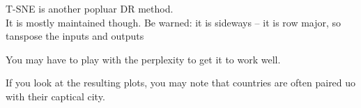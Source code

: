 \documentclass[11pt]{article}
\begin{document}
T-SNE is another popluar DR method.\\It is mostly maintained though. Be
warned: it is sideways -- it is row major, so tanspose the inputs and
outputs

You may have to play with the perplexity to get it to work well.

If you look at the resulting plots, you may note that countries are
often paired uo with their captical city.


    
    
    
    
\end{document}
